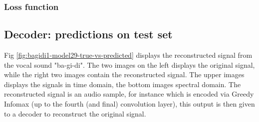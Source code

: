 	
	
		\subsubsection{Loss function}
		
	



	
	
	\subsection{Decoder: predictions on test set}
	Fig \ref{fig:bagidi1-model29-true-vs-predicted} displays the reconstructed signal from the vocal sound "ba-gi-di". The two images on the left displays the original signal, while the right two images contain the reconstructed signal.  The upper images displays the signals in time domain, the bottom images spectral domain. The reconstructed signal is an audio sample, for instance which is encoded via Greedy Infomax (up to the fourth (and final) convolution layer), this output is then given to a decoder to reconstruct the original signal.
	




